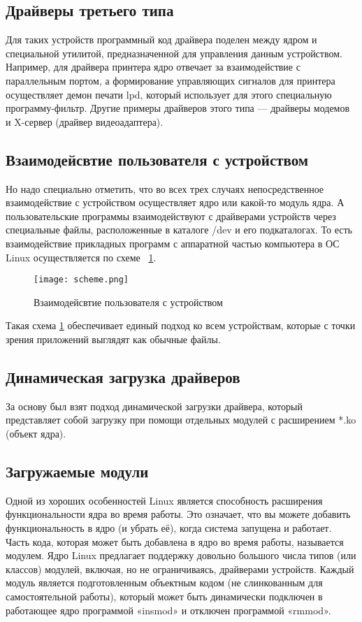 \subsection{Драйверы третьего типа}
Для таких устройств программный код драйвера поделен между ядром и специальной утилитой, предназначенной для управления данным устройством. Например, для драйвера принтера ядро отвечает за взаимодействие с параллельным портом, а формирование управляющих сигналов для принтера осуществляет демон печати lpd, который использует для этого специальную программу-фильтр. Другие примеры драйверов этого типа — драйверы модемов и X-сервер (драйвер видеоадаптера).

\subsection{Взаимодейсвтие пользователя с устройством}
Но надо специально отметить, что во всех трех случаях непосредственное взаимодействие с устройством осуществляет ядро или какой-то модуль ядра. А пользовательские программы взаимодействуют с драйверами устройств через специальные файлы, расположенные в каталоге /dev и его подкаталогах. То есть взаимодействие прикладных программ с аппаратной частью компьютера в ОС Linux осуществляется по схеме ~\ref{image:scheme}.
 
\begin{figure}[h]
  \centering
  \texttt{[image: scheme.png]}
  \caption{Взаимодейсвтие пользователя с устройством}
  \label{image:scheme}
\end{figure}

Такая схема \ref{image:scheme} обеспечивает единый подход ко всем устройствам, которые с точки зрения приложений выглядят как обычные файлы.

\subsection{Динамическая загрузка драйверов}
За основу был взят подход динамической загрузки драйвера, который представляет собой загрузку при помощи отдельных модулей с расширением *.ko (объект ядра).

\subsection{Загружаемые модули}
Одной из хороших особенностей Linux является способность расширения функциональности ядра во время работы. Это означает, что вы можете добавить функциональность в ядро (и убрать её), когда система запущена и работает. Часть кода, которая может быть добавлена в ядро во время работы, называется модулем. Ядро Linux предлагает поддержку довольно большого числа типов (или классов) модулей, включая, но не ограничиваясь, драйверами устройств. Каждый модуль является подготовленным объектным кодом (не слинкованным для самостоятельной работы), который может быть динамически подключен в работающее ядро программой «insmod» и отключен программой «rmmod». \cite{ldd}

